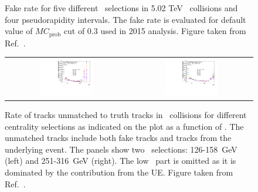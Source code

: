 \begin{figure}
\begin{tabular}{cc}
\end{tabular}
\caption{Fake rate for five different \ptjet\ selections in 5.02 TeV \pp\ collisions and four pseudorapidity intervals.
The fake rate is evaluated for default value of $MC_{\mathrm{prob}}$ cut of 0.3 used in 2015 analysis.
Figure taken from Ref.~\cite{Sickles:2235420}.}
\label{fig:fakeratepp}
\end{figure}  

\begin{figure}
\centering
\begin{tabular}{cc}
\includegraphics[width=0.45\textwidth]{figures/main/corrections/fake_rate_pt_125GeV.pdf} &
\includegraphics[width=0.45\textwidth]{figures/main/corrections/fake_rate_pt_251GeV.pdf} \\
\end{tabular}
\caption{ Rate of tracks unmatched to truth tracks
in \pbpb\ collisions for different centrality selections as indicated on the plot as a function of \pttrk.
The unmatched tracks include both fake tracks and tracks from the underlying event.
The panels show two \ptjet\ selections: 126-158~GeV (left) and 251-316~GeV (right).
The low \pT\ part is omitted as it is dominated by the contribution from the UE.
Figure taken from Ref.~\cite{Sickles:2235420}.}
\label{fig:fakeratepbpb}
\end{figure}
